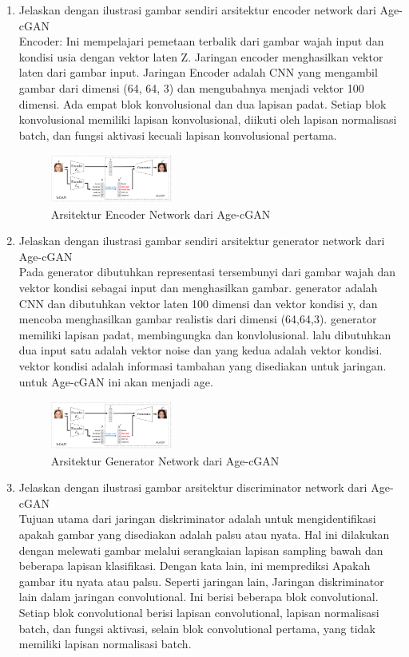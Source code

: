 \begin{enumerate}
\item Jelaskan dengan ilustrasi gambar sendiri arsitektur encoder network dari Age-cGAN\\
Encoder: Ini mempelajari pemetaan terbalik dari gambar wajah input dan kondisi usia dengan vektor laten Z.
Jaringan encoder menghasilkan vektor laten dari gambar input. Jaringan Encoder adalah CNN yang mengambil gambar dari dimensi (64, 64, 3) dan mengubahnya menjadi vektor 100 dimensi.
Ada empat blok konvolusional dan dua lapisan padat.
Setiap blok konvolusional memiliki lapisan konvolusional, diikuti oleh lapisan normalisasi batch, dan fungsi aktivasi kecuali lapisan konvolusional pertama.

\begin{figure}[H]
\includegraphics[width=4cm]{figures/1174002/9/3.png}
\centering
\caption{Arsitektur Encoder Network dari Age-cGAN}
\end{figure}

\item Jelaskan dengan ilustrasi gambar sendiri arsitektur generator network dari Age-cGAN\\
Pada generator dibutuhkan representasi tersembunyi dari gambar wajah dan vektor kondisi sebagai input dan menghasilkan gambar. generator adalah CNN dan dibutuhkan vektor laten 100 dimensi dan vektor kondisi y, dan mencoba menghasilkan gambar realistis dari dimensi (64,64,3). generator memiliki lapisan padat, membingungka dan konvlolusional. lalu dibutuhkan dua input satu adalah vektor noise dan yang kedua adalah vektor kondisi. vektor kondisi adalah informasi tambahan yang disediakan untuk jaringan. untuk Age-cGAN ini akan menjadi age.

\begin{figure}[H]
\includegraphics[width=4cm]{figures/1174002/9/3.png}
\centering
\caption{Arsitektur Generator Network dari Age-cGAN}
\end{figure}

\item Jelaskan dengan ilustrasi gambar arsitektur discriminator network dari
Age-cGAN\\
Tujuan utama dari jaringan diskriminator adalah untuk mengidentifikasi apakah gambar yang disediakan adalah palsu atau nyata. Hal ini dilakukan dengan melewati gambar melalui serangkaian lapisan sampling bawah dan beberapa lapisan klasifikasi. Dengan kata lain, ini memprediksi Apakah gambar itu nyata atau palsu. Seperti jaringan lain, Jaringan diskriminator lain dalam jaringan convolutional. Ini berisi beberapa blok convolutional. Setiap blok convolutional berisi lapisan convolutional, lapisan normalisasi batch, dan fungsi aktivasi, selain blok convolutional pertama, yang tidak memiliki lapisan normalisasi batch. 



\end{enumerate}
